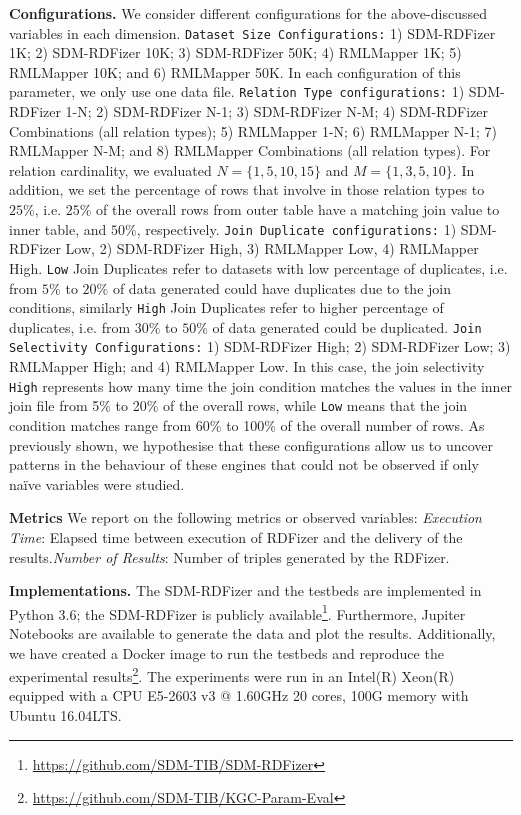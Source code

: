 \noindent \textbf{Configurations.}
We consider different configurations for the above-discussed variables in each dimension. 
%
\texttt{Dataset Size Configurations:} 1) SDM-RDFizer 1K; 2) SDM-RDFizer 10K; 3) SDM-RDFizer 50K; 4) RMLMapper 1K; 5) RML\-Mapper 10K; and 6) RMLMapper 50K. In each configuration of this parameter, we only use one data file.
%
\texttt{Relation Type configurations:} 1) SDM-RDFizer 1-N; 2) SDM-RDFizer N-1; 3) SDM-RDFizer N-M; 4) SDM-RDFizer Combinations (all relation types); 5) RMLMapper 1-N; 6) RMLMapper N-1; 7) RMLMapper N-M; and 8) RMLMapper Combinations (all relation types). For relation cardinality, we evaluated $N=\{1, 5, 10, 15\}$ and $M=\{1, 3, 5, 10\}$. In addition, we set the percentage of rows that involve in those relation types to $25\%$, i.e. $25\%$ of the overall rows from outer table have a matching join value to inner table, and $50\%$, respectively.
%
\texttt{Join Duplicate configurations:}  1) SDM-RDFizer Low, 2) SDM-RDFizer High, 3) RMLMapper Low, 4) RMLMapper High. \texttt{Low} Join Duplicates refer to datasets with low percentage of duplicates, i.e. from $5\%$ to $20\%$ of data generated could have duplicates due to the join conditions, similarly 
\texttt{High} Join Duplicates refer to higher percentage of duplicates, i.e. from $30\%$ to $50\%$ of data generated could be duplicated. 
%
\texttt{Join Selectivity Configurations:} 1) SDM-RDFizer High; 2) SDM-RDFizer Low; 3) RMLMapper High; and 4) RMLMapper Low. In this case, the join selectivity \texttt{High} represents how many time the join condition matches the values in the inner join file from 5\% to 20\% of the overall rows, while \texttt{Low} means that the join condition matches range from 60\% to 100\% of the overall number of rows. As previously shown, we hypothesise that these configurations allow us to uncover patterns in the behaviour of these engines that could not be observed if only na{\"i}ve variables were studied. 

\noindent \textbf{Metrics}
We report on the following metrics or observed variables: 
\textit{Execution Time}: Elapsed time between execution of RDFizer and the delivery of the results.\textit{Number of Results}: Number of triples generated by the RDFizer.

\noindent \textbf{Implementations.} 
The SDM-RDFizer and the testbeds are implemented in Python 3.6; the SDM-RDFizer is publicly available\footnote{\url{https://github.com/SDM-TIB/SDM-RDFizer}}. Furthermore, Jupiter Notebooks are available to generate the data and plot the results. Additionally, we have created a Docker image to run the testbeds and reproduce the experimental results\footnote{\url{https://github.com/SDM-TIB/KGC-Param-Eval}}. The experiments were run in an Intel(R) Xeon(R) equipped with a CPU E5-2603 v3 @ 1.60GHz 20 cores, 100G memory with Ubuntu 16.04LTS.


